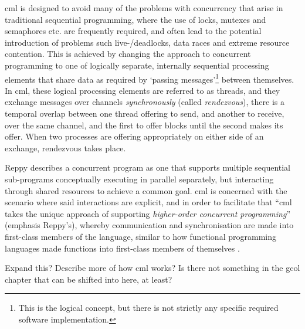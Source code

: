 \Gls{cml} is designed to avoid many of the problems with concurrency that arise in traditional sequential programming, where the use of locks, mutexes and semaphores etc. are frequently required, and often lead to the potential introduction of problems such live-/deadlocks, data races and extreme resource contention.  This is achieved by changing the approach to concurrent programming to one of logically separate, internally sequential processing elements that share data as required by `passing messages'\footnote{This is the logical concept, but there is not strictly any specific required software implementation.} between themselves.  In \gls{cml}, these logical processing elements are referred to as threads, and they exchange messages over channels \emph{synchronously} (called \emph{rendezvous}), \ie{} there is a temporal overlap between one thread offering to send, and another to receive, over the same channel, and the first to offer blocks until the second makes its offer.  When two processes are offering appropriately on either side of an exchange, rendezvous takes place.

Reppy describes a concurrent program as one that supports multiple sequential sub-programs conceptually executing in parallel separately, but interacting through shared resources to achieve a common goal.  \Gls{cml} is concerned with the scenario where said interactions are explicit, and in order to facilitate that \enquote{\gls{cml} takes the unique approach of supporting \emph{higher-order concurrent programming}} (emphasis Reppy's), whereby communication and synchronisation are made into first-class members of the language, similar to how functional programming languages made functions into first-class members of themselves \cite[Preface]{Reppy2007}.

\begin{anfxerror}
Expand this?  Describe more of how \gls{cml} works?  Is there not something in the gcol chapter that can be shifted into here, at least?
\end{anfxerror}